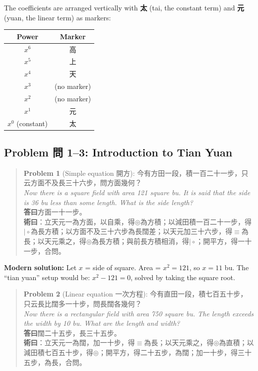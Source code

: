 \documentclass[11pt,a4paper]{article}
\newenvironment{vol3problembox}{%
  \begin{quote}
  \itshape
  \color{vol3color}
}{%
  \end{quote}
}
\begin{document}
The coefficients are arranged vertically with \textbf{太} (tai, the constant term) and \textbf{元} (yuan, the linear term) as markers:

\begin{center}
\begin{tabular}{c|c}
\textbf{Power} & \textbf{Marker} \\
\hline
$x^6$ & 高 \\
$x^5$ & 上 \\
$x^4$ & 天 \\
$x^3$ & (no marker) \\
$x^2$ & (no marker) \\
$x^1$ & 元 \\
$x^0$ (constant) & 太 \\
\end{tabular}
\end{center}

\subsection{Problem 問 1--3: Introduction to Tian Yuan}

\begin{vol3problembox}
\textbf{Problem 1} (Simple equation 開方): 今有方田一段，積一百二十一步，只云方面不及長三十六步，問方面幾何？\\[0.2cm]
\textit{Now there is a square field with area 121 square bu. It is said that the side is 36 bu less than some length. What is the side length?}\\[0.2cm]
\textbf{答曰}方面一十一步。\\[0.2cm]
\textbf{術曰}：立天元一為方面，以自乘，得$\circledcirc$為方積；以減田積一百二十一步，得$\mid\circ$為長方積；以方面不及三十六步為長闊差；以天元加三十六步，得$\equiv$為長；以天元乘之，得$\circledcirc$為長方積；與前長方積相消，得$\mid\circ$；開平方，得一十一步，合問。
\end{vol3problembox}

\textbf{Modern solution:} Let $x$ = side of square. Area = $x^2 = 121$, so $x = 11$ bu. The ``tian yuan'' setup would be: $x^2 - 121 = 0$, solved by taking the square root.

\vspace{0.3cm}

\begin{vol3problembox}
\textbf{Problem 2} (Linear equation 一次方程): 今有直田一段，積七百五十步，只云長比闊多一十步，問長闊各幾何？\\[0.2cm]
\textit{Now there is a rectangular field with area 750 square bu. The length exceeds the width by 10 bu. What are the length and width?}\\[0.2cm]
\textbf{答曰}闊二十五步，長三十五步。\\[0.2cm]
\textbf{術曰}：立天元一為闊，加一十步，得$\equiv$為長；以天元乘之，得$\circledcirc$為直積；以減田積七百五十步，得$\circledcirc$；開平方，得二十五步，為闊；加一十步，得三十五步，為長，合問。
\end{vol3problembox}
\end{document}
